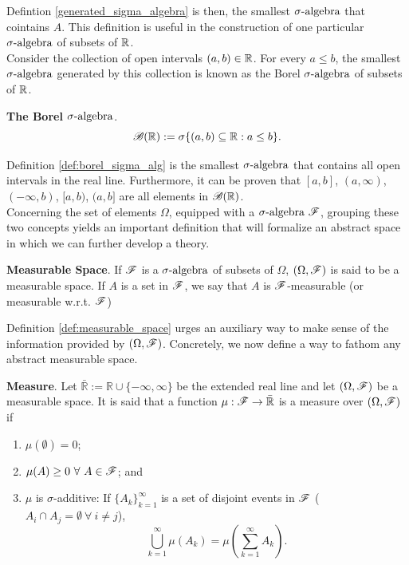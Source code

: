 \documentclass[../TGMAFFIRO.tex]{subfiles}
\begin{document}
Defintion \ref{generated_sigma_algebra} is then, the smallest $\sigma\text{-algebra}$ that cointains $A$. This definition is useful in the construction of one particular $\sigma\text{-algebra}$ of subsets of $\mathbb{R}$.\\

Consider the collection of open intervals $(a,b) \in \mathbb{R}$. For every $a \leq b$, the smallest $\sigma\text{-algebra}$ generated by this collection is known as the Borel $\sigma\text{-algebra}$ of subsets of $\mathbb{R}$.

\begin{definition}{\textbf{The Borel $\sigma\text{-algebra}$}}\label{def:borel_sigma_alg}.
		\begin{equation}
			\mathscr{B}(\mathbb{R}) := \sigma\{(a,b) \subseteq \mathbb{R}:a\leq b\}.
		\end{equation}
\end{definition}

Definition \ref{def:borel_sigma_alg} is the smallest $\sigma\text{-algebra}$ that contains all open intervals in the real line. Furthermore, it can be proven that $[a, b]$, $(a,\infty)$, $(-\infty, b)$, $[a, b)$, $(a, b]$ are all elements in $\mathscr{B}(\mathbb{R})$.\\

Concerning the set of elements $\Omega$, equipped with a $\sigma\text{-algebra} \ \mathscr{F}$, grouping these two concepts yields an important definition that will formalize an abstract space in which we can further develop a theory.

\begin{definition}{\textbf{Measurable Space}.} \label{def:measurable_space}
	If $\mathscr{F}$ is a $\sigma\text{-algebra}$ of subsets of $\Omega$, $(\Omega, \mathscr{F})$ is said to be a measurable space. If $A$ is a set in $\mathscr{F}$, we say that $A$ is $\mathscr{F}$-measurable (or measurable w.r.t. $\mathscr{F}$)
\end{definition}

Definition \ref{def:measurable_space} urges an auxiliary way to make sense of the information provided by $(\Omega, \mathscr{F})$. Concretely, we now define a way to fathom any abstract measurable space.

\begin{definition}{\textbf{Measure}.}
	Let $\bar{\mathbb R} := \mathbb R \cup \{-\infty, \infty\}$ be the extended real line and let $(\Omega, \mathscr{F})$ be a measurable space. It is said that a function $\mu: \mathscr{F} \rightarrow \bar{\mathbb R}$ is a measure over $(\Omega, \mathscr{F})$ if
	\begin{enumerate}
		\item $\mu(\emptyset) = 0$;
		\item $\mu(A) \geq 0\ \forall \ A \in \mathscr{F} $; and
		\item $\mu$ is $\sigma$-additive: If $\{A_k\}_{k=1}^{\infty}$ is a set of disjoint events in $\mathscr{F}$ ($A_i \cap A_j = \emptyset \ \forall \ i \neq j$), 
		\begin{equation*}
			\bigcup_{k=1}^{\infty} \mu(A_k) = \mu(\sum_{k=1}^{\infty} A_k).
		\end{equation*}
	\end{enumerate}
\end{definition}
\end{document}
